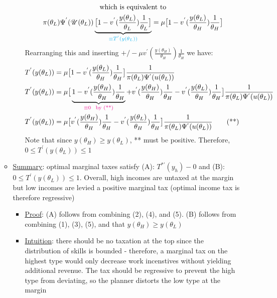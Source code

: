 \documentclass{article}
\begin{document}
\begin{itemize}
\begin{itemize}
\begin{itemize}
\begin{gather*}
                \text{which is equivalent to} \\
                \pi(\theta_{L}) \Psi^{'}(\mathcal{U}(\theta_{L})) \underbrace{\big[1 - v^{'}(\frac{y(\theta_{L})}{\theta_{L}}) \frac{1}{\theta_{L}} \big]}_{\begingroup\color{cyan} \equiv T^{'}(y(\theta_{L})) \endgroup} = \mu \big[1 - v^{'}(\frac{y(\theta_{L})}{\theta_{H}}) \frac{1}{\theta_{H}} \big]
            \end{gather*}
            Rearranging this and inserting $+/- \mu v^{'}(\frac{y(\theta_{H})}{\theta_{H}}) \frac{1}{\theta_{H}}$ we have:
            \begin{align*}
                T^{'}(y(\theta_{L})) &= \mu \big[1 - v^{'}(\frac{y(\theta_{L})}{\theta_{H}}) \frac{1}{\theta_{H}} \big] \frac{1}{\pi(\theta_{L}) \Psi^{'}(u(\theta_{L}))} \\
                T^{'}(y(\theta_{L})) &= \mu \big[\underbrace{1 - v^{'}(\frac{y(\theta_{H})}{\theta_{H}}) \frac{1}{\theta_{H}}}_{\begingroup\color{magenta} \equiv 0 \ \ \text{by (**)}\endgroup} + v^{'}(\frac{y(\theta_{H})}{\theta_{H}})\frac{1}{\theta_{H}} - v^{'}(\frac{y(\theta_{L})}{\theta_{H}})\frac{1}{\theta_{H}} \big] \frac{1}{\pi(\theta_{L}) \Psi^{'}(u(\theta_{L}))} \\
                T^{'}(y(\theta_{L})) &= \mu \big[ v^{'}(\frac{y(\theta_{H})}{\theta_{H}})\frac{1}{\theta_{H}} - v^{'}(\frac{y(\theta_{L})}{\theta_{H}})\frac{1}{\theta_{H}} \big] \frac{1}{\pi(\theta_{L}) \Psi^{'}(u(\theta_{L}))} \tag{**}
            \end{align*}
            Note that since $y(\theta_{H}) \geq y(\theta_{L})$, ** must be positive. Therefore, $0 \leq T^{'}(y(\theta_{L})) \leq 1$
        \end{itemize}
        \item  \underline{Summary}: optimal marginal taxes satisfy (A): $T^{*'}(y_{h}) - 0$ and (B): $0 \leq T^{'}(y(\theta_{L})) \leq 1$. Overall, high incomes are untaxed at the margin but low incomes are levied a positive marginal tax (optimal income tax is therefore regressive)
        \begin{itemize}
            \item \underline{Proof}: (A) follows from combining (2), (4), and (5). (B) follows from combining (1), (3), (5), and that $y(\theta_{H}) \geq y(\theta_{L})$
            \item  \underline{Intuition}: there should be no taxation at the top since the distribution of skills is bounded - therefore, a marginal tax on the highest type would only decrease work incenstives without yielding additional revenue. The tax should be regressive to prevent the high type from deviating, so the planner distorts the low type at the margin
        \end{itemize}
    \end{itemize}
\end{itemize}
\end{document}
